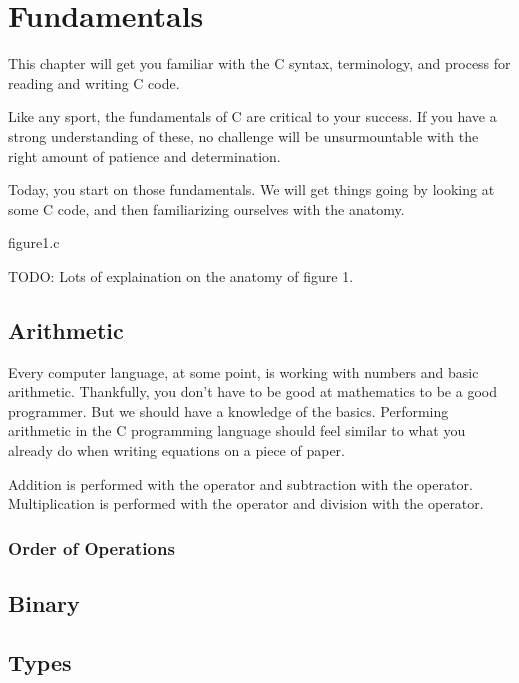 \chapter{Fundamentals}

This chapter will get you familiar with the C syntax, terminology, and
process for reading and writing C code.

Like any sport, the fundamentals of C are critical to your success. If you have
a strong understanding of these, no challenge will be unsurmountable with the
right amount of patience and determination.

Today, you start on those fundamentals. We will get things going by looking at
some C code, and then familiarizing ourselves with the anatomy.


\begin{code}{figure1.c}

\end{code}


TODO: Lots of explaination on the anatomy of figure 1.


\section{Arithmetic}

Every computer language, at some point, is working with numbers and basic
arithmetic. Thankfully, you don't have to be good at mathematics to be a good
programmer. But we should have a knowledge of the basics. Performing arithmetic
in the C programming language should feel similar to what you already do when
writing equations on a piece of paper.

Addition is performed with the \ident{+} operator and subtraction with the
\ident{-} operator. Multiplication is performed with the \ident{*} operator
and division with the \ident{/} operator.

\subsection{Order of Operations}

\section{Binary}

\section{Types}
